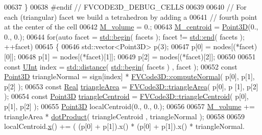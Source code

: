 \begin{DoxyCode}
00637         \}
00638 \textcolor{preprocessor}{#endif // FVCODE3D\_DEBUG\_CELLS}
00639 
00640         \textcolor{comment}{// For each (triangular) facet we build a tetrahedron by adding a}
00641         \textcolor{comment}{// fourth point at the center of the cell}
00642         \hyperlink{classFVCode3D_1_1Mesh3D_1_1Cell3D_a7616a6d28fcd8013bc52f4d754569e60}{M\_volume} = 0.;
00643         \hyperlink{classFVCode3D_1_1Mesh3D_1_1Cell3D_a85077932a074f0903d085f9d33a13e09}{M\_centroid} = \hyperlink{classFVCode3D_1_1Point3D}{Point3D}(0., 0., 0.);
00644         \textcolor{keywordflow}{for}(\textcolor{keyword}{auto} facet = \hyperlink{namespacestd_acec9a198880c12f51f02be95a298a48b}{std::begin}( facets ); facet != \hyperlink{namespacestd_aeb4b319cf9afda99ba1f47d32df15bc9}{std::end}( facets ); ++facet)
00645         \{
00646             std::vector<Point3D> p(3);
00647             p[0] = nodes[(*facet)[0]];
00648             p[1] = nodes[(*facet)[1]];
00649             p[2] = nodes[(*facet)[2]];
00650 
00651             \textcolor{keyword}{const} \hyperlink{namespaceFVCode3D_a4bf7e328c75d0fd504050d040ebe9eda}{UInt} index = \hyperlink{namespaceFVCode3D_a705717c0673e24ca607c7a65054de4f7}{std::distance}( \hyperlink{namespacestd_acec9a198880c12f51f02be95a298a48b}{std::begin}( facets ) , facet );
00652             \textcolor{keyword}{const} \hyperlink{classFVCode3D_1_1Point3D}{Point3D} triangleNormal = sign[index] * 
      \hyperlink{namespaceFVCode3D_afdf87b62988c2271186926eb3a3baedc}{FVCode3D::computeNormal}( p[0], p[1], p[2] );
00653             \textcolor{keyword}{const} \hyperlink{namespaceFVCode3D_a40c1f5588a248569d80aa5f867080e83}{Real} \hyperlink{namespaceFVCode3D_a38b320ef9683fae74a67a2a5a921f0d9}{triangleArea} = \hyperlink{namespaceFVCode3D_a38b320ef9683fae74a67a2a5a921f0d9}{FVCode3D::triangleArea}( p[0], p
      [1], p[2] );
00654             \textcolor{keyword}{const} \hyperlink{classFVCode3D_1_1Point3D}{Point3D} \hyperlink{namespaceFVCode3D_a5b8d6a9c921fcd809d263ef9c484b1ad}{triangleCentroid} = 
      \hyperlink{namespaceFVCode3D_a5b8d6a9c921fcd809d263ef9c484b1ad}{FVCode3D::triangleCentroid}( p[0], p[1], p[2] );
00655             \hyperlink{classFVCode3D_1_1Point3D}{Point3D} localCentroid(0., 0., 0.);
00656 
00657             \hyperlink{classFVCode3D_1_1Mesh3D_1_1Cell3D_a7616a6d28fcd8013bc52f4d754569e60}{M\_volume} += triangleArea * \hyperlink{namespaceFVCode3D_ad07be7f9ed843ca65d02d0303dae6cb4}{dotProduct}( triangleCentroid , triangleNormal );
00658 
00659             localCentroid.\hyperlink{classFVCode3D_1_1Point3D_ae015d6aa31f8b304f69696bdcbd4da19}{x}() += ( (p[0] + p[1]).x() * (p[0] + p[1]).x() * triangleNormal.

\end{DoxyCode}

